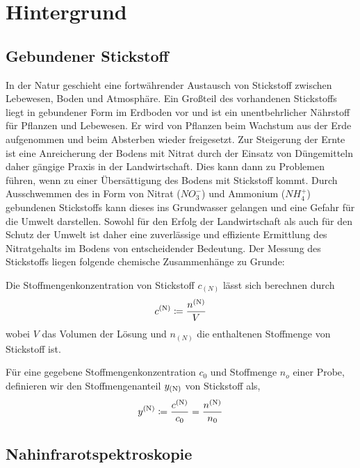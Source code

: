 \section{Hintergrund}
\label{sec:Hintergrund}

	\subsection{Gebundener Stickstoff}
	\label{ssec:Gebundener Stickstoff}

	In der Natur geschieht eine fortwährender Austausch von Stickstoff zwischen Lebewesen, Boden und Atmosphäre.
	Ein Großteil des vorhandenen Stickstoffs liegt in gebundener Form im Erdboden vor und ist ein unentbehrlicher Nährstoff für Pflanzen und Lebewesen.
	Er wird von Pflanzen beim Wachstum aus der Erde aufgenommen und beim Absterben wieder freigesetzt.
    Zur Steigerung der Ernte ist eine Anreicherung der Bodens mit Nitrat durch der Einsatz von Düngemitteln daher gängige Praxis in der Landwirtschaft.\cite{Umweltbundesamt2017}
    Dies kann dann zu Problemen führen, wenn zu einer Übersättigung des Bodens mit Stickstoff kommt.
    Durch Ausschwemmen des in Form von Nitrat ($NO_3^-$) und Ammonium ($NH_4^+$) gebundenen Stickstoffs kann dieses ins Grundwasser gelangen und eine Gefahr für die Umwelt darstellen.
    Sowohl für den Erfolg der Landwirtschaft als auch für den Schutz der Umwelt ist daher eine zuverlässige und effiziente Ermittlung des Nitratgehalts im Bodens von entscheidender Bedeutung.
    Der Messung des Stickstoffs liegen folgende chemische Zusammenhänge zu Grunde:


    Die Stoffmengenkonzentration von Stickstoff $c_{(N)}$ lässt sich berechnen durch
    	\[
			c^{\mathrm{(N)}} \coloneqq \frac{n^{\mathrm{(N)}}}{V}
		\]
		wobei $V$ das Volumen der Lösung und $n_{(N)}$ die enthaltenen Stoffmenge von Stickstoff ist.

    Für eine gegebene Stoffmengenkonzentration $c_0$  und Stoffmenge $n_o$ einer Probe, definieren wir den Stoffmengenanteil $y_{\mathrm{(N)}}$ von Stickstoff als,
        \[
			y^{\mathrm{(N)}} \coloneqq \frac{c^{\mathrm{(N)}}}{c_0} = \frac{n^{\mathrm{(N)}}}{n_0}
		\]


	\subsection{Nahinfrarotspektroskopie}
	\label{ssec:Nahinfrarotspek}

